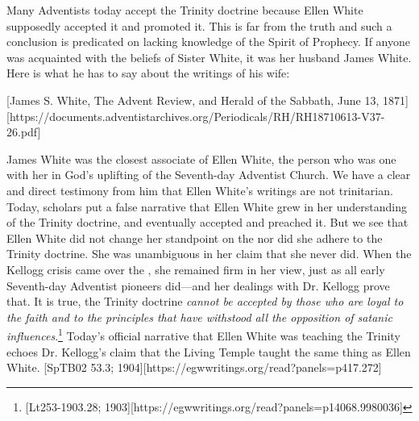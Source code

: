 Many Adventists today accept the Trinity doctrine because Ellen White supposedly accepted it and promoted it. This is far from the truth and such a conclusion is predicated on lacking knowledge of the Spirit of Prophecy. If anyone was acquainted with the beliefs of Sister White, it was her husband James White. Here is what he has to say about the writings of his wife:

[James S. White, The Advent Review, and Herald of the Sabbath, June 13, 1871][https://documents.adventistarchives.org/Periodicals/RH/RH18710613-V37-26.pdf]

James White was the closest associate of Ellen White, the person who was one with her in God’s uplifting of the Seventh-day Adventist Church. We have a clear and direct testimony from him that Ellen White’s writings are not trinitarian. Today, scholars put a false narrative that Ellen White grew in her understanding of the Trinity doctrine, and eventually accepted and preached it. But we see that Ellen White did not change her standpoint on the  nor did she adhere to the Trinity doctrine. She was unambiguous in her claim that she never did. When the Kellogg crisis came over the , she remained firm in her view, just as all early Seventh-day Adventist pioneers did—and her dealings with Dr. Kellogg prove that. It is true, the Trinity doctrine \textit{cannot be accepted by those who are loyal to the faith and to the principles that have withstood all the opposition of satanic influences}.\footnote{[Lt253-1903.28; 1903][https://egwwritings.org/read?panels=p14068.9980036]} Today’s official narrative that Ellen White was teaching the Trinity echoes Dr. Kellogg’s claim that the Living Temple taught the same thing as Ellen White. [SpTB02 53.3; 1904][https://egwwritings.org/read?panels=p417.272]

